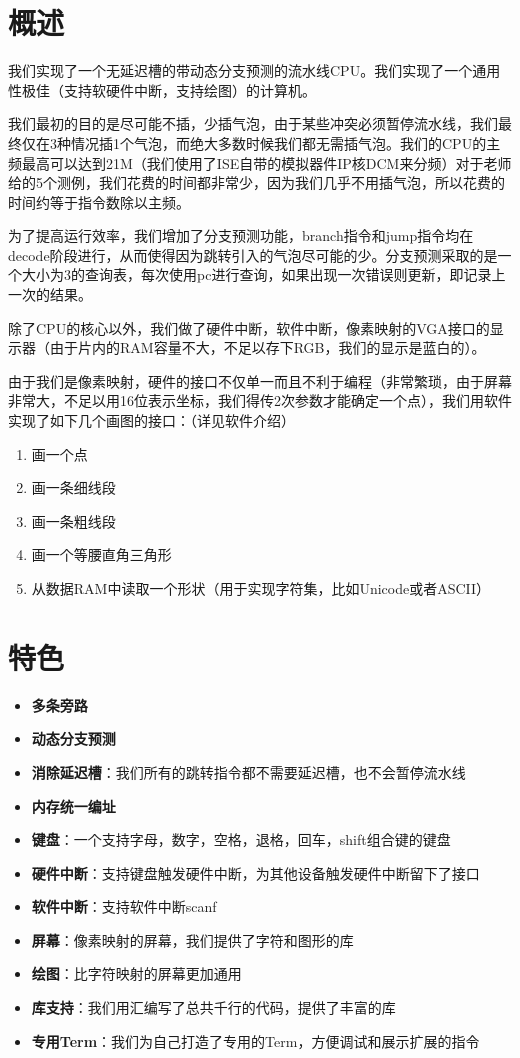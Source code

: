 \section{概述}

我们实现了一个无延迟槽的带动态分支预测的流水线CPU。我们实现了一个通用性极佳（支持软硬件中断，支持绘图）的计算机。

我们最初的目的是尽可能不插，少插气泡，由于某些冲突必须暂停流水线，我们最终仅在3种情况插1个气泡，而绝大多数时候我们都无需插气泡。我们的CPU的主频最高可以达到21M（我们使用了ISE自带的模拟器件IP核DCM来分频）对于老师给的5个测例，我们花费的时间都非常少，因为我们几乎不用插气泡，所以花费的时间约等于指令数除以主频。

为了提高运行效率，我们增加了分支预测功能，branch指令和jump指令均在decode阶段进行，从而使得因为跳转引入的气泡尽可能的少。分支预测采取的是一个大小为3的查询表，每次使用pc进行查询，如果出现一次错误则更新，即记录上一次的结果。

除了CPU的核心以外，我们做了硬件中断，软件中断，像素映射的VGA接口的显示器（由于片内的RAM容量不大，不足以存下RGB，我们的显示是蓝白的）。

由于我们是像素映射，硬件的接口不仅单一而且不利于编程（非常繁琐，由于屏幕非常大，不足以用16位表示坐标，我们得传2次参数才能确定一个点），我们用软件实现了如下几个画图的接口：（详见软件介绍）

\begin{enumerate}
    \item 画一个点
    \item 画一条细线段
    \item 画一条粗线段
    \item 画一个等腰直角三角形
    \item 从数据RAM中读取一个形状（用于实现字符集，比如Unicode或者ASCII）
\end{enumerate}

\section{特色}


\begin{itemize}
    \item \textbf{多条旁路}
    \item \textbf{动态分支预测}
    \item \textbf{消除延迟槽}：我们所有的跳转指令都不需要延迟槽，也不会暂停流水线
    \item \textbf{内存统一编址}
    \item \textbf{键盘}：一个支持字母，数字，空格，退格，回车，shift组合键的键盘
    \item \textbf{硬件中断}：支持键盘触发硬件中断，为其他设备触发硬件中断留下了接口
    \item \textbf{软件中断}：支持软件中断scanf
    \item \textbf{屏幕}：像素映射的屏幕，我们提供了字符和图形的库
    \item \textbf{绘图}：比字符映射的屏幕更加通用
    \item \textbf{库支持}：我们用汇编写了总共千行的代码，提供了丰富的库
    \item \textbf{专用Term}：我们为自己打造了专用的Term，方便调试和展示扩展的指令
\end{itemize}
